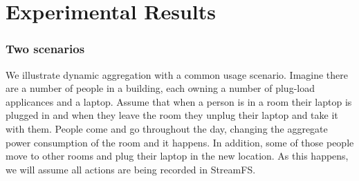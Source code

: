 \section{Experimental Results}

\subsubsection{Two scenarios}
We illustrate dynamic aggregation with a common usage scenario.  Imagine there are a number of people in a building,
each owning a number of plug-load applicances and a laptop.  Assume that when a person is in a room their laptop
is plugged in and when they leave the room they unplug their laptop and take it with them.  People come and go
throughout the day, changing the aggregate power consumption of the room and it happens.  In addition, some
of those people move to other rooms and plug their laptop in the new location.  As this happens, we will assume
all actions are being recorded in StreamFS.

